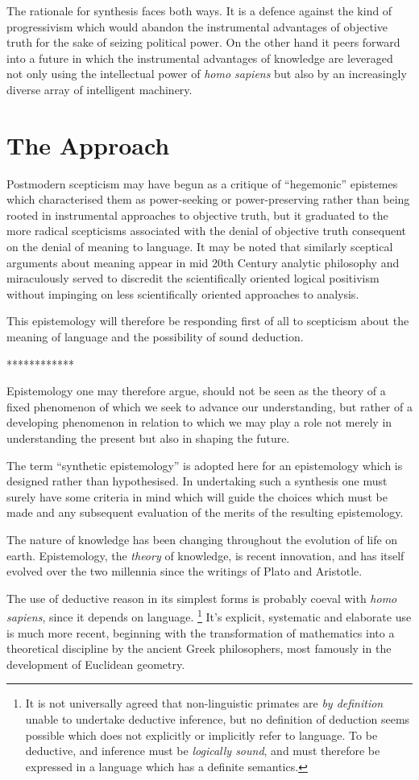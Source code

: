 \documentclass[10pt,titlepage]{book}
\begin{document}
The rationale for synthesis faces both ways.
It is a defence against the kind of progressivism which would abandon the instrumental advantages of objective truth for the sake of seizing political power.
On the other hand it peers forward into a future in which the instrumental advantages of knowledge are leveraged not only using the intellectual power of \emph{homo sapiens} but also by an increasingly diverse array of intelligent machinery.

\section{The Approach}

Postmodern scepticism may have begun as a critique of ``hegemonic'' epistemes which characterised them as power-seeking or power-preserving rather than being rooted in instrumental approaches to objective truth, but it graduated to the more radical scepticisms associated with the denial of objective truth consequent on the denial of meaning to language.
It may be noted that similarly sceptical arguments about meaning appear in mid 20th Century analytic philosophy and miraculously served to discredit the scientifically oriented logical positivism without impinging on less scientifically oriented approaches to analysis.

This epistemology will therefore be responding first of all to scepticism about the meaning of language and the possibility of sound deduction.

************


Epistemology one may therefore argue, should not be seen as the theory of a fixed phenomenon of which we seek to advance our understanding, but rather of a developing phenomenon in relation to which we may play a role not merely in understanding the present but also in shaping the future.

The term ``synthetic epistemology'' is adopted here for an epistemology which is designed rather than hypothesised.
In undertaking such a synthesis one must surely have some criteria in mind which will guide the choices which must be made and any subsequent evaluation of the merits of the resulting epistemology.

The nature of knowledge has been changing throughout the evolution of life on earth.
Epistemology, the \emph{theory} of knowledge, is recent innovation, and has itself evolved over the two millennia since the writings of Plato and Aristotle.

The use of deductive reason in its simplest forms is probably coeval with \emph{homo sapiens}, since it depends on language.%
\footnote{It is not universally agreed that non-linguistic primates are \emph{by definition} unable to undertake deductive inference, but no definition of deduction seems possible which does not explicitly or implicitly refer to language.  To be deductive, and inference must be \emph{logically sound}, and must therefore be expressed in a language which has a definite semantics.}
It's explicit, systematic and elaborate use is much more recent, beginning with the transformation of mathematics into a theoretical discipline by the ancient Greek philosophers, most famously in the development of Euclidean geometry.
\end{document}
